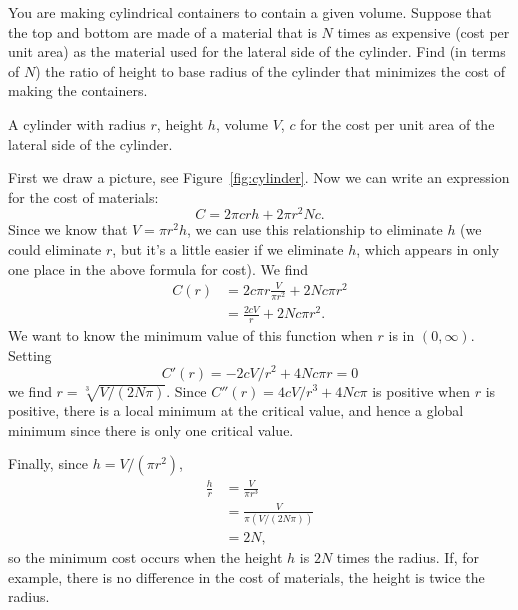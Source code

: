 \begin{example}
You are making cylindrical containers to contain a given volume.  Suppose
that the top and bottom are made of a material that is $N$ times as
expensive (cost per unit area) as the material used for the lateral side of
the cylinder.  Find (in terms of $N$) the ratio of height to base radius of
the cylinder that minimizes the cost of making the containers.
\end{example}

\begin{marginfigure}
\caption{A cylinder with radius $r$, height $h$, volume $V$, $c$ for
  the cost per unit area of the lateral side of the cylinder.}
\label{fig:cylinder}
\end{marginfigure}

\begin{solution}
First we draw a picture, see Figure~\ref{fig:cylinder}.  Now we can
write an expression for the cost of materials:
\[
  C = 2\pi crh+2\pi r^2Nc.
\]
Since we know that $V=\pi r^2h$, we can use this relationship to
eliminate $h$ (we could eliminate $r$, but it's a little easier if we
eliminate $h$, which appears in only one place in the above formula
for cost).  We find
\begin{align*}
C(r)&=2c\pi r\frac{V}{\pi r^2}+2Nc\pi r^2\\
&=\frac{2cV}{r}+2Nc\pi r^2.
\end{align*}
We want to know the minimum value of this function when $r$ is in
$(0,\infty)$. Setting
\[
C'(r)=-2cV/r^2+4Nc\pi r =0
\]
we find $r=\sqrt[3]{V/(2N\pi)}$.  Since $C''(r)=4cV/r^3+4Nc\pi$ is
  positive when $r$ is positive, there is a local minimum at the
  critical value, and hence a global minimum since there is only one
  critical value.

Finally, since $h=V/(\pi r^2)$, 
\begin{align*}
\frac{h}{r}&=\frac{V}{\pi r^3}\\ 
&=\frac{V}{\pi(V/(2N\pi))}\\ 
&=2N,
\end{align*}
so the minimum cost occurs when the height $h$ is $2N$ times the
radius. If, for example, there is no difference in the cost of
materials, the height is twice the radius.
\end{solution}


